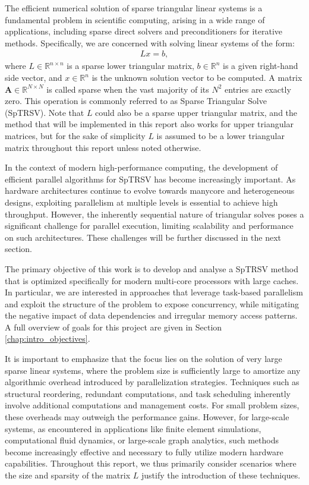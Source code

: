 The efficient numerical solution of sparse triangular linear systems is a fundamental problem in scientific computing, arising in a wide range of applications, including sparse direct solvers and preconditioners for iterative methods. Specifically, we are concerned with solving linear systems of the form: 
\begin{align}
    Lx =b,
\end{align}
where $L \in \mathbb{R}^{n \times n}$ is a sparse lower triangular matrix, $b \in \mathbb{R}^n$ is a given right-hand side vector, and $x \in \mathbb{R}^n$ is the unknown solution vector to be computed. A matrix $\mathbf{A} \in \mathbb{R}^{N\times N}$ is called sparse when the vast majority of its $N^{2}$ entries are exactly zero. This operation is commonly referred to as Sparse Triangular Solve (SpTRSV). Note that $L$ could also be a sparse upper triangular matrix, and the method that will be implemented in this report also works for upper triangular matrices, but for the sake of simplicity $L$ is assumed to be a lower triangular matrix throughout this report unless noted otherwise. 

In the context of modern high-performance computing, the development of efficient parallel algorithms for SpTRSV has become increasingly important. As hardware architectures continue to evolve towards manycore and heterogeneous designs, exploiting parallelism at multiple levels is essential to achieve high throughput. However, the inherently sequential nature of triangular solves poses a significant challenge for parallel execution, limiting scalability and performance on such architectures. These challenges will be further discussed in the next section.

The primary objective of this work is to develop and analyse a SpTRSV method that is optimized specifically for modern multi-core processors with large caches. In particular, we are interested in approaches that leverage task-based parallelism and exploit the structure of the problem to expose concurrency, while mitigating the negative impact of data dependencies and irregular memory access patterns. A full overview of goals for this project are given in Section \ref{chap:intro_objectives}.

It is important to emphasize that the focus lies on the solution of very large sparse linear systems, where the problem size is sufficiently large to amortize any algorithmic overhead introduced by parallelization strategies. Techniques such as structural reordering, redundant computations, and task scheduling inherently involve additional computations and management costs. For small problem sizes, these overheads may outweigh the performance gains. However, for large-scale systems, as encountered in applications like finite element simulations, computational fluid dynamics, or large-scale graph analytics, such methods become increasingly effective and necessary to fully utilize modern hardware capabilities. Throughout this report, we thus primarily consider scenarios where the size and sparsity of the matrix $L$ justify the introduction of these techniques. 

